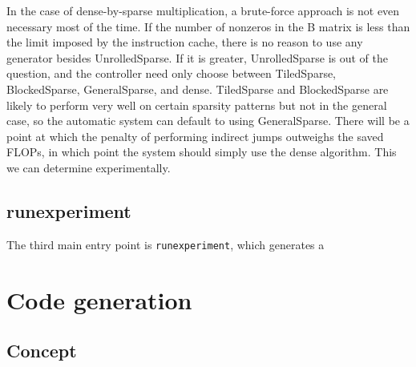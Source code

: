 In the case of dense-by-sparse multiplication, a brute-force approach is not even necessary most of the time. If the number of nonzeros in the B matrix is less than the limit imposed by the instruction cache, there is no reason to use any generator besides UnrolledSparse. If it is greater, UnrolledSparse is out of the question, and the controller need only choose between TiledSparse, BlockedSparse, GeneralSparse, and dense. TiledSparse and BlockedSparse are likely to perform very well on certain sparsity patterns but not in the general case, so the automatic system can default to using GeneralSparse. There will be a point at which the penalty of performing indirect jumps outweighs the saved FLOPs, in which point the system should simply use the dense algorithm. This we can determine experimentally.


\subsection{runexperiment}
The third main entry point is \texttt{runexperiment}, which generates a 




\section{Code generation}
\subsection{Concept}
